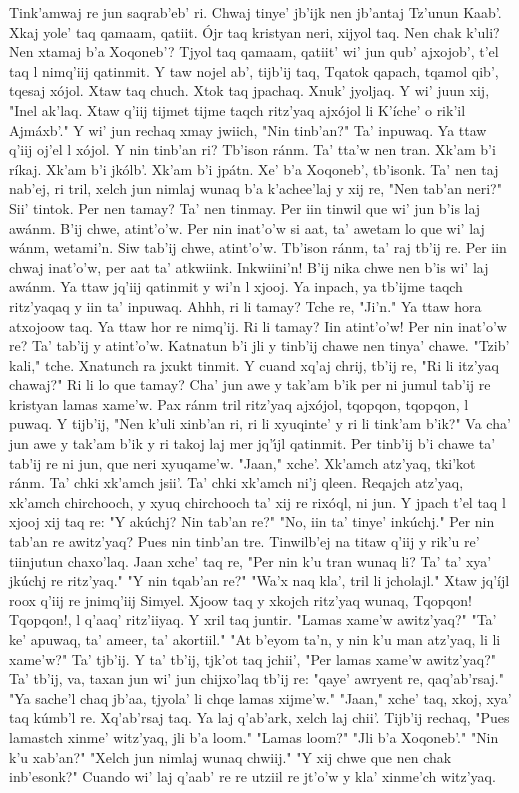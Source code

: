 \documentclass[12pt]{article}
\begin{document}
Tink'amwaj re jun saqrab'eb' ri. Chwaj tinye' jb'ijk nen jb'antaj {Tz'unun Kaab'}. Xkaj yole' taq qamaam, qatiit. \'Ojr taq kristyan neri, xijyol taq. {Nen chak} k'uli? Nen xtamaj b'a Xoqoneb'? Tjyol taq qamaam, qatiit' wi' jun qub' ajxojob', t'el taq l nimq'iij qatinmit. Y taw nojel ab', tijb'ij taq, Tqatok qapach, tqamol qib', tqesaj x\'ojol. Xtaw taq chuch. Xtok taq jpachaq. Xnuk' jyoljaq. Y wi' juun xij, "Inel ak'laq. Xtaw q'iij tijmet tijme taqch ritz'yaq ajx\'ojol li K'\'iche' o rik'il Ajm\'axb'." Y wi' jun rechaq xmay jwiich, "Nin tinb'an?" Ta' inpuwaq. Ya ttaw q'iij oj'el l x\'ojol. Y nin tinb'an ri? Tb'ison r\'anm. Ta' tta'w nen tran. Xk'am b'i r\'ikaj. Xk'am b'i jk\'olb'. Xk'am b'i jp\'atn. Xe' b'a Xoqoneb', tb'isonk. Ta' {nen taj} nab'ej, ri tril, xelch jun nimlaj wunaq b'a k'achee'laj y xij re, "Nen tab'an neri?" Sii' tintok. Per nen tamay? Ta' nen tinmay. Per iin tinwil que wi' jun b'is laj aw\'anm. B'ij chwe, atint'o'w. Per nin inat'o'w si aat, ta' awetam lo que wi' laj w\'anm, wetami'n. Siw tab'ij chwe, atint'o'w. Tb'ison r\'anm, ta' raj tb'ij re. Per iin chwaj inat'o'w, per aat ta' atkwiink. Inkwiini'n! B'ij nika chwe nen b'is wi' laj aw\'anm. Ya ttaw jq'iij qatinmit y wi'n l xjooj. Ya inpach, ya tb'ijme taqch ritz'yaqaq y iin ta' inpuwaq. Ahhh, ri li tamay? Tche re, "Ji'n." Ya ttaw hora atxojoow taq. Ya ttaw hor re nimq'ij. Ri li tamay? Iin atint'o'w! Per nin inat'o'w re? Ta' tab'ij y atint'o'w. Katnatun b'i jli y tinb'ij chawe nen tinya' chawe. "Tzib' kali," tche. Xnatunch ra jxukt tinmit. Y cuand xq'aj chrij, tb'ij re, "Ri li itz'yaq chawaj?" Ri li lo que tamay? Cha' jun awe y tak'am b'ik per ni jumul tab'ij re kristyan lamas xame'w. Pax r\'anm tril ritz'yaq ajx\'ojol, tqopqon, tqopqon, l puwaq. Y tijb'ij, "{Nen k'uli} xinb'an ri, ri li xyuqinte' y ri li tink'am b'ik?" Va cha' jun awe y tak'am b'ik y ri takoj laj mer jq'\'{\i}jl qatinmit. Per tinb'ij b'i chawe ta' tab'ij re ni jun, que neri xyuqame'w. "Jaan," xche'. Xk'amch atz'yaq, tki'kot r\'anm. Ta' chki xk'amch jsii'. Ta' chki xk'amch ni'j qleen. Reqajch atz'yaq, xk'amch chirchooch, y xyuq chirchooch ta' xij re rix\'oql, ni jun. Y jpach t'el taq l xjooj xij taq re: "Y ak\'uchj? Nin tab'an re?" "No, iin ta' tinye' ink\'uchj." Per nin tab'an re awitz'yaq? Pues nin tinb'an tre. Tinwilb'ej na titaw q'iij y {rik'u re'} tiinjutun chaxo'laq. Jaan xche' taq re, "Per {nin k'u} tran wunaq li? Ta' ta' xya' jk\'uchj re ritz'yaq." "Y nin tqab'an re?" "Wa'x naq kla', tril li jcholajl." Xtaw jq'\'ijl roox q'iij re jnimq'iij Simyel. Xjoow taq y xkojch ritz'yaq wunaq, Tqopqon! Tqopqon!, l q'aaq' ritz'iiyaq. Y xril taq juntir. "Lamas xame'w awitz'yaq?" "Ta' ke' apuwaq, ta' ameer, ta' akortiil." "At b'eyom ta'n, y {nin k'u} man atz'yaq, li li xame'w?" Ta' tjb'ij. Y ta' tb'ij, tjk'ot taq jchii', "Per lamas xame'w awitz'yaq?" Ta' tb'ij, va, taxan jun wi' jun chijxo'laq tb'ij re: "qaye' awryent re, qaq'ab'rsaj." "Ya sache'l chaq jb'aa, tjyola' li chqe lamas xijme'w." "Jaan," xche' taq, xkoj, xya' taq k\'umb'l re. Xq'ab'rsaj taq. Ya laj q'ab'ark, xelch laj chii'. Tijb'ij rechaq, "Pues lamastch xinme' witz'yaq, jli b'a loom." "Lamas loom?" "Jli b'a Xoqoneb'." "{Nin k'u} xab'an?" "Xelch jun nimlaj wunaq chwiij." "Y xij chwe que {nen chak} inb'esonk?" Cuando wi' laj q'aab' re re utziil re jt'o'w y kla' xinme'ch witz'yaq. 
\end{document}
